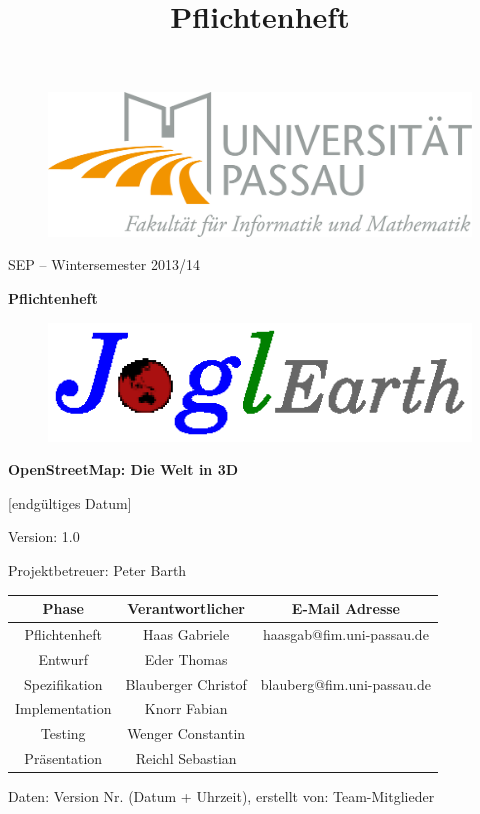 \documentclass[10pt]{report}
\begin{document}
\title{Pflichtenheft}
\begin{figure}
	\begin{flushright}
		\includegraphics[scale=0.5]{uniLogo.png}
	\end{flushright}
\end{figure}
\begin{center}
\vspace{2.0 cm}
{\LARGE SEP – Wintersemester 2013/14}

\vspace{1.0 cm}
\textbf{{\Huge Pflichtenheft}}

\vspace{0.5 cm}
\begin{figure}[!htb]
\begin{center}
	\includegraphics[scale=1.0]{projektLogo.eps}
\end{center}
\end{figure}

\vspace{0.5 cm}
\textbf{{\Huge OpenStreetMap: Die Welt in 3D}}

\vspace{1.5 cm}
[endgültiges Datum]

\vspace{0.5 cm}
Version: 1.0

\vspace{1.5 cm}
{\Large Projektbetreuer: Peter Barth}

\vspace{1.5 cm}
\begin{tabular}{c c c}
Phase & Verantwortlicher & E-Mail Adresse \\
\hline \hline
Pflichtenheft & Haas Gabriele & haasgab@fim.uni-passau.de \\
\hline \hline
Entwurf & Eder Thomas & \\
\hline \hline
Spezifikation & Blauberger Christof & blauberg@fim.uni-passau.de \\
\hline \hline
Implementation & Knorr Fabian & \\
\hline \hline
Testing & Wenger Constantin & \\
\hline \hline
Präsentation & Reichl Sebastian & \\
\end{tabular}


\end{center}
Daten: Version Nr. (Datum + Uhrzeit), erstellt von: Team-Mitglieder
\end{document}
